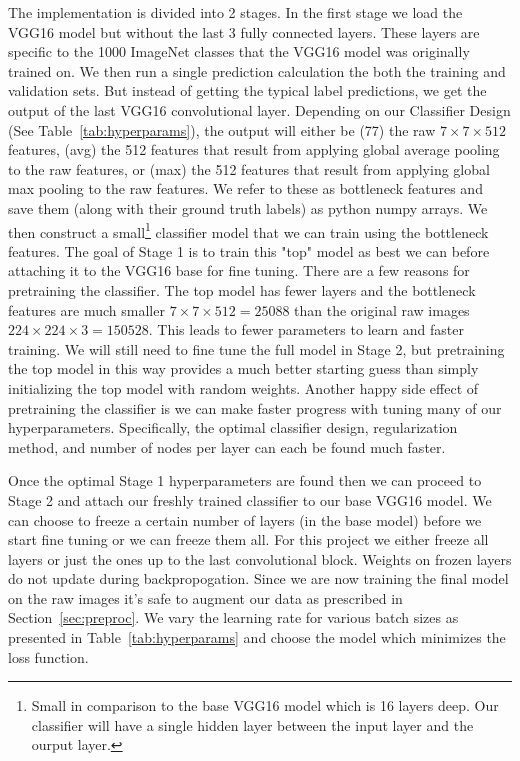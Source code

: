 \documentclass[12pt,journal,compsoc]{IEEEtran}
\begin{document}

The implementation is divided into 2 stages. In the first stage we load the VGG16 model but without the last 3 fully connected layers. These layers are specific to the 1000 ImageNet classes that the VGG16 model was originally trained on. We then run a single prediction calculation the both the training and validation sets. But instead of getting the typical label predictions, we get the output of the last VGG16 convolutional layer. Depending on our Classifier Design (See Table~\ref{tab:hyperparams}), the output will either be (77) the raw $7\times7\times512$ features, (avg) the 512 features that result from applying global average pooling to the raw features, or (max) the 512 features that result from applying global max pooling to the raw features. We refer to these as bottleneck features and save them (along with their ground truth labels) as python numpy arrays. We then construct a small\footnote{Small in comparison to the base VGG16 model which is 16 layers deep. Our classifier will have a single hidden layer between the input layer and the ourput layer.} classifier model that we can train using the bottleneck features. The goal of Stage 1 is to train this "top" model as best we can before attaching it to the VGG16 base for fine tuning. There are a few reasons for pretraining the classifier. The top model has fewer layers and the bottleneck features are much smaller $7\times7\times512=25088$ than the original raw images $224\times224\times3=150528$. This leads to fewer parameters to learn and faster training. We will still need to fine tune the full model in Stage 2, but pretraining the top model in this way provides a much better starting guess than simply initializing the top model with random weights. Another happy side effect of pretraining the classifier is we can make faster progress with tuning many of our hyperparameters. Specifically, the optimal classifier design, regularization method, and number of nodes per layer can each be found much faster.

Once the optimal Stage 1 hyperparameters are found then we can proceed to Stage 2 and attach our freshly trained classifier to our base VGG16 model. We can choose to freeze a certain number of layers (in the base model) before we start fine tuning or we can freeze them all. For this project we either freeze all layers or just the ones up to the last convolutional block. Weights on frozen layers do not update during backpropogation. Since we are now training the final model on the raw images it's safe to augment our data as prescribed in Section~\ref{sec:preproc}. We vary the learning rate for various batch sizes as presented in Table~\ref{tab:hyperparams} and choose the model which minimizes the loss function. 
\end{document}
